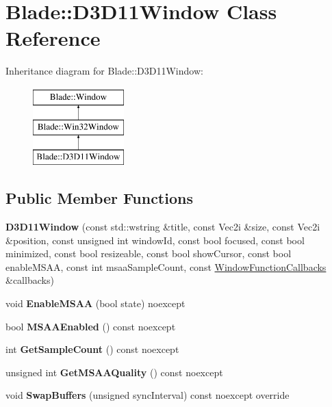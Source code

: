 \hypertarget{class_blade_1_1_d3_d11_window}{}\section{Blade\+:\+:D3\+D11\+Window Class Reference}
\label{class_blade_1_1_d3_d11_window}
Inheritance diagram for Blade\+:\+:D3\+D11\+Window\+:\begin{figure}[H]
\begin{center}
\leavevmode
\includegraphics[height=3.000000cm]{class_blade_1_1_d3_d11_window}
\end{center}
\end{figure}
\subsection*{Public Member Functions}
\begin{DoxyCompactItemize}
\item 
\mbox{\label{class_blade_1_1_d3_d11_window_ab14cbfe064a8a96ec88599ab90c11dab}} 
{\bfseries D3\+D11\+Window} (const std\+::wstring \&title, const Vec2i \&size, const Vec2i \&position, const unsigned int window\+Id, const bool focused, const bool minimized, const bool resizeable, const bool show\+Cursor, const bool enable\+M\+S\+AA, const int msaa\+Sample\+Count, const \hyperlink{struct_blade_1_1_window_function_callbacks}{Window\+Function\+Callbacks} \&callbacks)
\item 
\mbox{\label{class_blade_1_1_d3_d11_window_a60102230ff52f3ef2fab1ac1c9436d75}} 
void {\bfseries Enable\+M\+S\+AA} (bool state) noexcept
\item 
\mbox{\label{class_blade_1_1_d3_d11_window_a5605a4f289232664252d3a4762880931}} 
bool {\bfseries M\+S\+A\+A\+Enabled} () const noexcept
\item 
\mbox{\label{class_blade_1_1_d3_d11_window_a1a45c76f3faeaa0e45c08a74777fb4fb}} 
int {\bfseries Get\+Sample\+Count} () const noexcept
\item 
\mbox{\label{class_blade_1_1_d3_d11_window_abe617d7b324cfbf8e68f969d0a7787a6}} 
unsigned int {\bfseries Get\+M\+S\+A\+A\+Quality} () const noexcept
\item 
\mbox{\label{class_blade_1_1_d3_d11_window_a46ab0b6ff2075dc16c84e23eb37e78fc}} 
void {\bfseries Swap\+Buffers} (unsigned sync\+Interval) const noexcept override
\end{DoxyCompactItemize}



